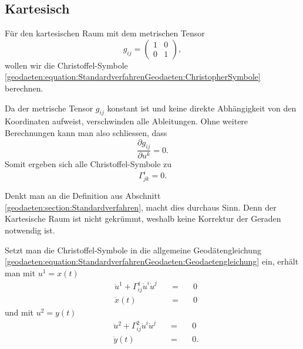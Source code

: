 %
%
%
%
\subsection{Kartesisch\label{geodaeten:section:Standardverfahren:Kartesisch}}

Für den kartesischen Raum mit dem metrischen Tensor
\begin{equation}
g_{i\!j} = \begin{pmatrix} 
	1 & 0 \\ 
	0 & 1 
\end{pmatrix},
\end{equation}
wollen wir die Christoffel-Symbole \eqref{geodaeten:equation:StandardverfahrenGeodaeten:ChristopherSymbole} berechnen.

Da der metrische Tensor $g_{i\!j}$ konstant ist und keine direkte Abhängigkeit von den Koordinaten aufweist, verschwinden alle Ableitungen.
Ohne weitere Berechnungen kann man also schliessen, dass
\begin{equation}
\frac{\partial g_{i\!j}}{\partial u^k} = 0 .
\end{equation}
Somit ergeben sich alle Christoffel-Symbole zu
\begin{equation}
\Gamma^i_{jk} = 0 .
\end{equation}

Denkt man an die Definition aus Abschnitt \ref{geodaeten:section:Standardverfahren}, macht dies durchaus Sinn.
Denn der Kartesische Raum ist nicht gekrümmt, weshalb keine Korrektur der Geraden notwendig ist.

Setzt man die Christoffel-Symbole in die allgemeine Geodätengleichung \eqref{geodaeten:equation:StandardverfahrenGeodaeten:Geodaetengleichung} ein, erhält man mit $u^1 = x(t)$
\begin{equation}
	\begin{alignedat}{3}
		&\ddot{u}^1 + \Gamma_{i\!j}^1 \dot{u}^i \dot{u}^j &\quad = \quad& 0 \\
		&\ddot{x}(t) &\quad = \quad& 0
	\end{alignedat}
	\label{geodaeten:equation:Standardverfahren:Kartesisch:x}
\end{equation}
und mit $u^2 = y(t)$
\begin{equation}
	\begin{alignedat}{3}
		&\ddot{u}^2 + \Gamma_{i\!j}^2 \dot{u}^i \dot{u}^j &\quad = \quad& 0 \\
		&\ddot{y}(t) &\quad = \quad& 0  .
	\end{alignedat}
	\label{geodaeten:equation:Standardverfahren:Kartesisch:y}
\end{equation}

